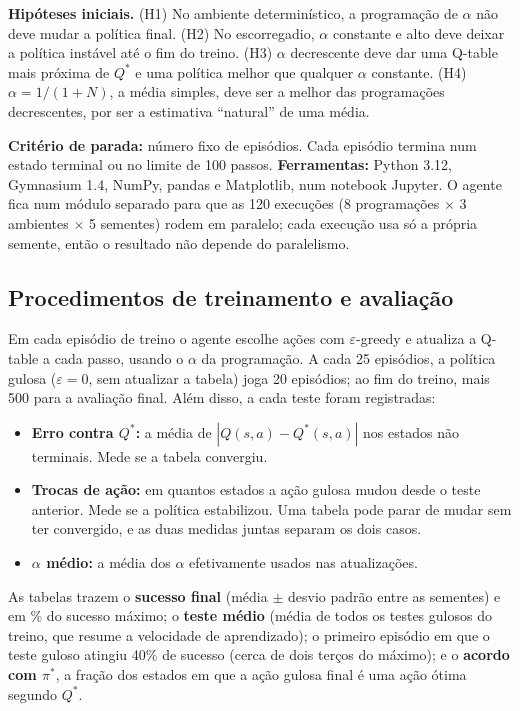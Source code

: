 \documentclass[11pt,a4paper]{article}
\begin{document}
\textbf{Hipóteses iniciais.}
(H1) No ambiente determinístico, a programação de $\alpha$ não deve mudar a política final.
(H2) No escorregadio, $\alpha$ constante e alto deve deixar a política instável até o fim do treino.
(H3) $\alpha$ decrescente deve dar uma Q-table mais próxima de $Q^*$ e uma política melhor que qualquer $\alpha$
constante.
(H4) $\alpha = 1/(1+N)$, a média simples, deve ser a melhor das programações decrescentes, por ser a estimativa
``natural'' de uma média.

\textbf{Critério de parada:} número fixo de episódios. Cada episódio termina num estado terminal ou no limite de 100
passos. \textbf{Ferramentas:} Python 3.12, Gymnasium 1.4, NumPy, pandas e Matplotlib, num notebook Jupyter. O agente fica
num módulo separado para que as 120 execuções (8 programações $\times$ 3 ambientes $\times$ 5 sementes) rodem em paralelo;
cada execução usa só a própria semente, então o resultado não depende do paralelismo.

\subsection{Procedimentos de treinamento e avaliação}

Em cada episódio de treino o agente escolhe ações com $\varepsilon$-greedy e atualiza a Q-table a cada passo, usando o
$\alpha$ da programação. A cada 25 episódios, a política gulosa ($\varepsilon = 0$, sem atualizar a tabela) joga 20
episódios; ao fim do treino, mais 500 para a avaliação final. Além disso, a cada teste foram registradas:

\begin{itemize}
  \item \textbf{Erro contra $Q^*$:} a média de $|Q(s,a) - Q^*(s,a)|$ nos estados não terminais. Mede se a tabela
    convergiu.
  \item \textbf{Trocas de ação:} em quantos estados a ação gulosa mudou desde o teste anterior. Mede se a política
    estabilizou. Uma tabela pode parar de mudar sem ter convergido, e as duas medidas juntas separam os dois casos.
  \item \textbf{$\alpha$ médio:} a média dos $\alpha$ efetivamente usados nas atualizações.
\end{itemize}

As tabelas trazem o \textbf{sucesso final} (média $\pm$ desvio padrão entre as sementes) e em \% do sucesso máximo; o
\textbf{teste médio} (média de todos os testes gulosos do treino, que resume a velocidade de aprendizado); o primeiro
episódio em que o teste guloso atingiu 40\% de sucesso (cerca de dois terços do máximo); e o \textbf{acordo com
$\pi^*$}, a fração dos estados em que a ação gulosa final é uma ação ótima segundo $Q^*$.
\end{document}
